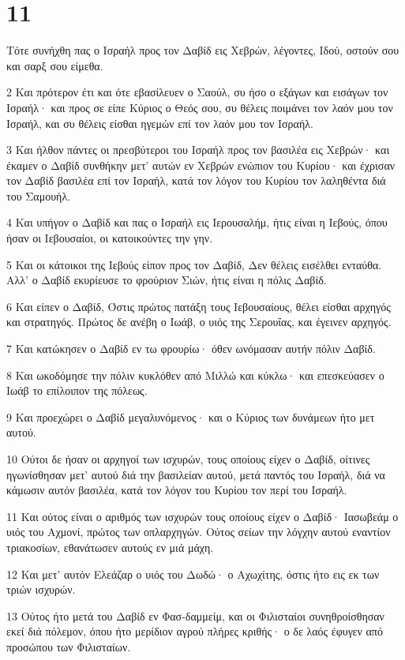 \chapter{11}

\par Τότε συνήχθη πας ο Ισραήλ προς τον Δαβίδ εις Χεβρών, λέγοντες, Ιδού, οστούν σου και σαρξ σου είμεθα.
\par 2 Και πρότερον έτι και ότε εβασίλευεν ο Σαούλ, συ ήσο ο εξάγων και εισάγων τον Ισραήλ· και προς σε είπε Κύριος ο Θεός σου, συ θέλεις ποιμάνει τον λαόν μου τον Ισραήλ, και συ θέλεις είσθαι ηγεμών επί τον λαόν μου τον Ισραήλ.
\par 3 Και ήλθον πάντες οι πρεσβύτεροι του Ισραήλ προς τον βασιλέα εις Χεβρών· και έκαμεν ο Δαβίδ συνθήκην μετ' αυτών εν Χεβρών ενώπιον του Κυρίου· και έχρισαν τον Δαβίδ βασιλέα επί τον Ισραήλ, κατά τον λόγον του Κυρίου τον λαληθέντα διά του Σαμουήλ.
\par 4 Και υπήγον ο Δαβίδ και πας ο Ισραήλ εις Ιερουσαλήμ, ήτις είναι η Ιεβούς, όπου ήσαν οι Ιεβουσαίοι, οι κατοικούντες την γην.
\par 5 Και οι κάτοικοι της Ιεβούς είπον προς τον Δαβίδ, Δεν θέλεις εισέλθει ενταύθα. Αλλ' ο Δαβίδ εκυρίευσε το φρούριον Σιών, ήτις είναι η πόλις Δαβίδ.
\par 6 Και είπεν ο Δαβίδ, Όστις πρώτος πατάξη τους Ιεβουσαίους, θέλει είσθαι αρχηγός και στρατηγός. Πρώτος δε ανέβη ο Ιωάβ, ο υιός της Σερουΐας, και έγεινεν αρχηγός.
\par 7 Και κατώκησεν ο Δαβίδ εν τω φρουρίω· όθεν ωνόμασαν αυτήν πόλιν Δαβίδ.
\par 8 Και ωκοδόμησε την πόλιν κυκλόθεν από Μιλλώ και κύκλω· και επεσκεύασεν ο Ιωάβ το επίλοιπον της πόλεως.
\par 9 Και προεχώρει ο Δαβίδ μεγαλυνόμενος· και ο Κύριος των δυνάμεων ήτο μετ αυτού.
\par 10 Ούτοι δε ήσαν οι αρχηγοί των ισχυρών, τους οποίους είχεν ο Δαβίδ, οίτινες ηγωνίσθησαν μετ' αυτού διά την βασιλείαν αυτού, μετά παντός του Ισραήλ, διά να κάμωσιν αυτόν βασιλέα, κατά τον λόγον του Κυρίου τον περί του Ισραήλ.
\par 11 Και ούτος είναι ο αριθμός των ισχυρών τους οποίους είχεν ο Δαβίδ· Ιασωβεάμ ο υιός του Αχμονί, πρώτος των οπλαρχηγών. Ούτος σείων την λόγχην αυτού εναντίον τριακοσίων, εθανάτωσεν αυτούς εν μιά μάχη.
\par 12 Και μετ' αυτόν Ελεάζαρ ο υιός του Δωδώ· ο Αχωχίτης, όστις ήτο εις εκ των τριών ισχυρών.
\par 13 Ούτος ήτο μετά του Δαβίδ εν Φασ-δαμμείμ, και οι Φιλισταίοι συνηθροίσθησαν εκεί διά πόλεμον, όπου ήτο μερίδιον αγρού πλήρες κριθής· ο δε λαός έφυγεν από προσώπου των Φιλισταίων.
